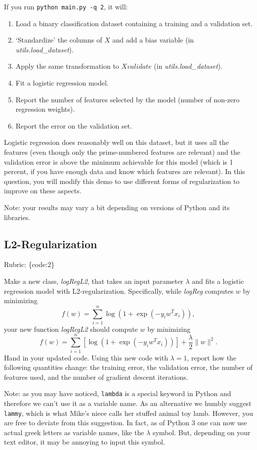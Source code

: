 \documentclass{article}
\def\rubric#1{\gre{Rubric: \{#1\}}}{}
\def\blu#1{{\color{blu}#1}}
\def\gre#1{{\color{gre}#1}}
\def\norm#1{\|#1\|}
\def\enum#1{\begin{enumerate}#1\end{enumerate}}
\begin{document}
If you run  \verb|python main.py -q 2|, it will:
\enum{
\item Load a binary classification dataset containing a training and a validation set.
\item `Standardize' the columns of $X$ and add a bias variable (in \emph{utils.load\_dataset}).
\item Apply the same transformation to $Xvalidate$ (in \emph{utils.load\_dataset}).
\item Fit a logistic regression model.
\item Report the number of features selected by the model (number of non-zero regression weights).
\item Report the error on the validation set.
}
Logistic regression does reasonably well on this dataset,
but it uses all the features (even though only the prime-numbered features are relevant)
and the validation error is above the minimum achievable for this model
(which is 1 percent, if you have enough data and know which features are relevant).
In this question, you will modify this demo to use different forms of regularization
 to improve on these aspects.

Note: your results may vary a bit depending on versions of Python and its libraries.


\subsection{L2-Regularization}
\rubric{code:2}

Make a new class, \emph{logRegL2}, that takes an input parameter $\lambda$ and fits a logistic regression model with L2-regularization. Specifically, while \emph{logReg} computes $w$ by minimizing
\[
f(w) = \sum_{i=1}^n \log(1+\exp(-y_iw^Tx_i)),
\]
your new function \emph{logRegL2} should compute $w$ by minimizing
\[
f(w) = \sum_{i=1}^n \left[\log(1+\exp(-y_iw^Tx_i))\right] + \frac{\lambda}{2}\norm{w}^2.
\]
\blu{Hand in your updated code. Using this new code with $\lambda = 1$, report how the following quantities change: the training error, the validation error, the number of features used, and the number of gradient descent iterations.}

Note: as you may have noticed, \texttt{lambda} is a special keyword in Python and therefore we can't use it as a variable name.
As an alternative we humbly suggest \texttt{lammy}, which is what Mike's niece calls her stuffed animal toy lamb.
However, you are free to deviate from this suggestion. In fact, as of Python 3 one can now use actual greek letters as variable names, like the $\lambda$ symbol. But, depending on your text editor, it may be annoying to input this symbol.
\end{document}
